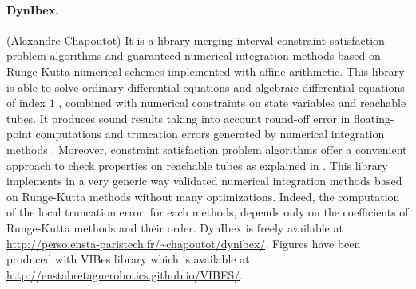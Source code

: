 \documentclass[EPiC]{easychair}
\begin{document}
 \paragraph{DynIbex.} (Alexandre Chapoutot) It is a library merging interval constraint satisfaction problem algorithms and guaranteed numerical integration methods based on Runge-Kutta numerical schemes implemented with affine arithmetic. This library is able to solve ordinary differential equations \cite{alexandreditsandretto:hal-01243053} and algebraic differential equations of index $1$ \cite{alexandreditsandretto:hal-01243044}, combined with numerical constraints on  state variables and reachable tubes. It produces sound results taking into account round-off error in floating-point computations and truncation errors generated by numerical integration methods \cite{doi:10.1080/10556788.2018.1459620}. 
 Moreover, constraint satisfaction problem algorithms offer a convenient approach to check properties on reachable tubes as explained in \cite{alexandreditsandretto:hal-01954764}. This library implements in a very generic way validated numerical integration methods based on Runge-Kutta methods without many optimizations. Indeed, the computation of the local truncation error, for each methods, depends only on the coefficients of Runge-Kutta methods and their order. DynIbex is freely available at \url{http://perso.ensta-paristech.fr/~chapoutot/dynibex/}. Figures have been produced with VIBes library \cite{Drevelle2014} which is available at \url{http://enstabretagnerobotics.github.io/VIBES/}.

\end{document}
